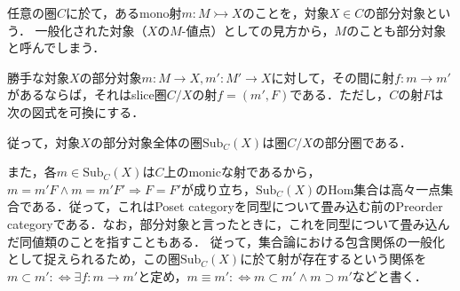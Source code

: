 \documentclass[uplatex, 12pt, dvipdfmx]{jsarticle}
\begin{document}
\begin{definition}[Subobject]
    任意の圏$C$に於て，あるmono射$m:M\rightarrowtail X$のことを，対象$X\in C$の部分対象という．
    一般化された対象（$X$の$M$-値点）としての見方から，$M$のことも部分対象と呼んでしまう．
\end{definition}
\begin{remark}[対象$X$の部分対象全体は圏をなす．]
    勝手な対象$X$の部分対象$m:M\to X,m':M'\to X$に対して，その間に射$f:m\to m'$があるならば，それはslice圏$C/X$の射$f=(m',F)$である．ただし，$C$の射$F$は次の図式を可換にする．
    \begin{center}
    \end{center}
    従って，対象$X$の部分対象全体の圏$\mathrm{Sub}_C(X)$は圏$C/X$の部分圏である．

    また，各$m\in \mathrm{Sub}_C(X)$は$C$上のmonicな射であるから，$m=m'F\land m=m'F'\Rightarrow F=F'$が成り立ち，$\mathrm{Sub}_C(X)$のHom集合は高々一点集合である．従って，これはPoset categoryを同型について畳み込む前のPreorder categoryである．なお，部分対象と言ったときに，これを同型について畳み込んだ同値類のことを指すこともある．
    従って，集合論における包含関係の一般化として捉えられるため，この圏$\mathrm{Sub}_C(X)$に於て射が存在するという関係を$m\subset m':\Leftrightarrow \exists f:m\to m'$と定め，$m \equiv m':\Leftrightarrow m\subset m'\land m\supset m'$などと書く．
\end{remark}
\end{document}
